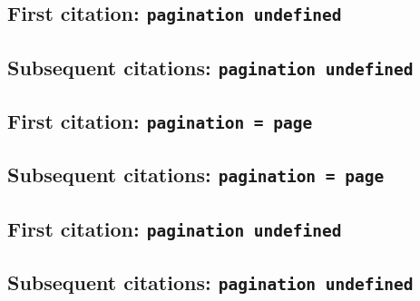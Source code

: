 \documentclass[a4paper]{article}
\begin{document}
\subsection{First citation: \texttt{pagination undefined}}

\cite{doomedprince}

\citereset
\cite[577]{doomedprince}

\citereset
\cite[note]{doomedprince}

\subsection{Subsequent citations: \texttt{pagination undefined}}

\cite{doomedprince}

\cite[577]{doomedprince}

\AtNextCite{\renewcommand*{\volcitedelim}{\addcomma\space}}
\cite[note]{doomedprince}

\subsection{First citation: \texttt{pagination = page}}

\cite{doomedprince:a}

\citereset
\cite[200]{doomedprince:a}

\citereset
\cite[note]{doomedprince:a}

\subsection{Subsequent citations: \texttt{pagination = page}}

\cite{doomedprince:a}

\cite[200]{doomedprince:a}

\cite[note]{doomedprince:a}

\subsection{First citation: \texttt{pagination undefined}}

\cite{ashurinscription}

\citereset
\cite[(obv.\ lines 10)143]{ashurinscription}

\citereset
\cite[(obv.\ lines 10--17)note]{ashurinscription}

\subsection{Subsequent citations: \texttt{pagination undefined}}
\end{document}
